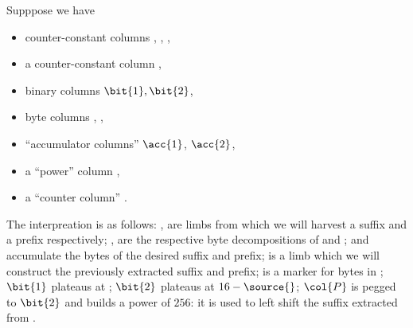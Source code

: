 Supppose we have
\begin{itemize}
	\item counter-constant columns  \sourceOne{}, \sourceTwo{}, \target{},
	\item a counter-constant column \source{}\mark{},
	\item binary columns $\bit{1}, \bit{2}$,
	\item byte columns \sourceOne{}\byte{}, \sourceTwo{}\byte{},
	\item ``accumulator columns'' $\acc{1}$, $\acc{2}$,
	\item a ``power'' column ,
	\item a ``counter column'' \ct{}.
\end{itemize}
The interpreation is as follows:
\sourceOne{}, \sourceTwo{} are limbs from which we will harvest a suffix and a prefix respectively;
\sourceOne{}\byte{}, \sourceTwo{}\byte{} are the respective byte decompositions of \sourceOne{} and \sourceTwo{};
 and  accumulate the bytes of the desired suffix and prefix;
\target{} is a limb which we will construct the previously extracted suffix and prefix;
\source{}\mark{} is a marker for bytes in \sourceOne{};
$\bit{1}$ plateaus at \source{}\mark{};
$\bit{2}$ plateaus at $16 - \source{}\mark{}$;
$\col{P}$ is pegged to $\bit{2}$ and builds a power of $256$: it is used to left shift the suffix extracted from \sourceOne{}.

